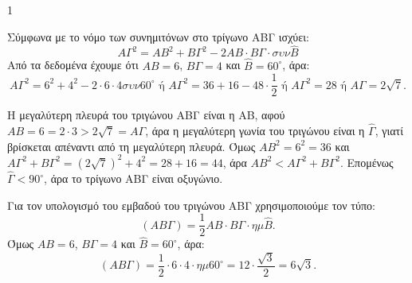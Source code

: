 \begin{ylh}{1}
    \item [Ύλη από εικόνα]
\end{ylh}
\begin{alist}
\item Σύμφωνα με το νόμο των συνημιτόνων στο τρίγωνο ΑΒΓ ισχύει:
    \[ A\Gamma^2 = AB^2 + B\Gamma^2 - 2AB \cdot B\Gamma \cdot \sigma\upsilon\nu \hat{B} \]
    Από τα δεδομένα έχουμε ότι $AB = 6$, $B\Gamma = 4$ και $\hat{B} = 60^\circ$, άρα:
    \[ A\Gamma^2 = 6^2 + 4^2 - 2 \cdot 6 \cdot 4 \sigma\upsilon\nu 60^\circ \text{ ή } A\Gamma^2 = 36 + 16 - 48 \cdot \frac{1}{2} \text{ ή } A\Gamma^2 = 28 \text{ ή } A\Gamma = 2\sqrt{7}. \]
    \monades{}
\item Η μεγαλύτερη πλευρά του τριγώνου ΑΒΓ είναι η ΑΒ, αφού $AB = 6 = 2 \cdot 3 > 2\sqrt{7} = A\Gamma$, άρα η μεγαλύτερη γωνία του τριγώνου είναι η $\hat{\Gamma}$, γιατί βρίσκεται απέναντι από τη μεγαλύτερη πλευρά. Όμως $AB^2 = 6^2 = 36$ και $A\Gamma^2 + B\Gamma^2 = (2\sqrt{7})^2 + 4^2 = 28 + 16 = 44$, άρα $AB^2 < A\Gamma^2 + B\Gamma^2$. Επομένως $\hat{\Gamma} < 90^\circ$, άρα το τρίγωνο ΑΒΓ είναι οξυγώνιο.
    \monades{}
\item Για τον υπολογισμό του εμβαδού του τριγώνου ΑΒΓ χρησιμοποιούμε τον τύπο:
    \[ (AB\Gamma) = \frac{1}{2} AB \cdot B\Gamma \cdot \eta\mu\hat{B}. \]
    Όμως $AB = 6$, $B\Gamma = 4$ και $\hat{B} = 60^\circ$, άρα:
    \[ (AB\Gamma) = \frac{1}{2} \cdot 6 \cdot 4 \cdot \eta\mu 60^\circ = 12 \cdot \frac{\sqrt{3}}{2} = 6\sqrt{3}. \]
    \monades{}
\end{alist}